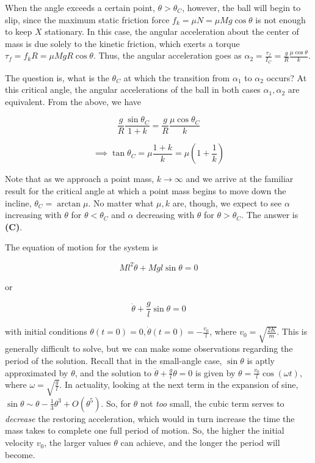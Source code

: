 \documentclass[12pt]{article}
\begin{document}
When the angle exceeds a certain point, $\theta > \theta_C$, however, the ball will begin to slip, since the maximum static friction force $f_k = \mu N = \mu M g \cos \theta$ is not enough to keep $X$ stationary. In this case, the angular acceleration about the center of mass is due solely to the kinetic friction, which exerts a torque $\tau_f = f_k R = \mu M g R \cos \theta$. Thus, the angular acceleration goes as $\alpha_2 = \frac{\tau_f}{I_C} = \frac{g}{R} \frac{\mu \cos \theta}{k}$.

The question is, what is the $\theta_C$ at which the transition from $\alpha_1$ to $\alpha_2$ occurs? At this critical angle, the angular accelerations of the ball in both cases $\alpha_1, \alpha_2$ are equivalent. From the above, we have

$$\frac{g}{R} \frac{\sin \theta_C}{1 + k} = \frac{g}{R} \frac{\mu \cos \theta_C}{k}$$

$$\implies \tan \theta_C = \mu \frac{1 + k}{k} = \mu \left( 1 + \frac{1}{k} \right)$$

Note that as we approach a point mass, $k \to \infty$ and we arrive at the familiar result for the critical angle at which a point mass begins to move down the incline, $\theta_C = \arctan \mu$. No matter what $\mu, k$ are, though, we expect to see $\alpha$ increasing with $\theta$ for $\theta < \theta_C$ and $\alpha$ decreasing with $\theta$ for $\theta > \theta_C$. The answer is \textbf{(C)}.


\vspace{2 \baselineskip}



The equation of motion for the system is

$$M l^2 \ddot{\theta} + M g l \sin \theta = 0$$

or

$$\ddot{\theta} + \frac{g}{l} \sin \theta = 0$$

with initial conditions $\theta (t = 0) = 0, \dot{\theta} (t = 0) = -\frac{v_0}{l}$, where $v_0 = \sqrt{\frac{2 K}{m}}$. This is generally difficult to solve, but we can make some observations regarding the period of the solution. Recall that in the small-angle case, $\sin \theta$ is aptly approximated by $\theta$, and the solution to $\ddot{\theta} + \frac{g}{l} \theta = 0$ is given by $\theta = \frac{v_0}{l} \cos (\omega t)$, where $\omega = \sqrt{\frac{g}{l}}$. In actuality, looking at the next term in the expansion of sine, $\sin \theta \sim \theta - \frac{1}{3} \theta^3 + O (\theta^5)$. So, for $\theta$ not \textit{too} small, the cubic term serves to \textit{decrease} the restoring acceleration, which would in turn increase the time the mass takes to complete one full period of motion. So, the higher the initial velocity $v_0$, the larger values $\theta$ can achieve, and the longer the period will become.
\end{document}
